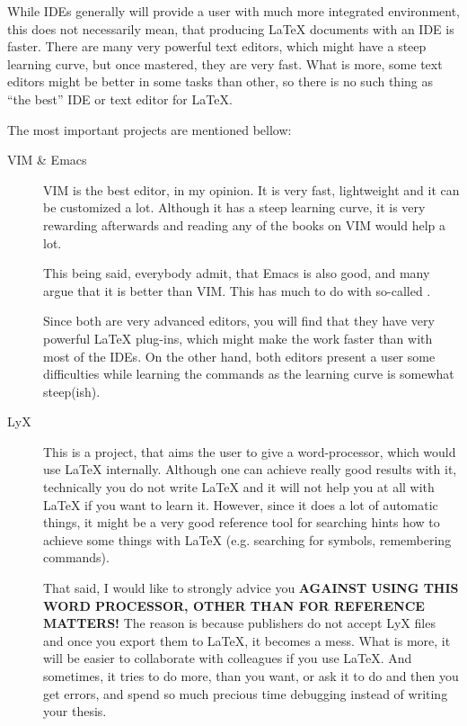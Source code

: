 \documentclass[
    draft
]{scrartcl}
\newcommand{\stress}[1]{\textbf{\uppercase{#1}}}
\begin{document}
%
While IDEs generally will provide a user with much more integrated environment,
    this does not necessarily mean, that producing \LaTeX{} documents with an
    IDE is faster. 
%
There are many very powerful text editors, which might have a steep learning
    curve, but once mastered, they are very fast.
%
What is more, some text editors might be better in some tasks than other, so
    there is no such thing as ``the best'' IDE or text editor for \LaTeX.

%
The most important projects are mentioned bellow:
\begin{description}
    \item[VIM \& Emacs] 
        VIM is the best editor, in my opinion.
        It is very fast, lightweight and it can be customized a lot.
        Although it has a steep learning curve, it is very rewarding afterwards
            and reading any of the books on VIM would help a lot. 
        
        This being said, everybody admit, that Emacs is also good, and many
            argue that it is better than VIM.
        This has much to do with so-called
        .

        Since both are very advanced editors, you will find that they have very
            powerful \LaTeX{} plug-ins, which might make the work faster than
            with most of the IDEs.
        On the other hand, both editors present a user some difficulties while
            learning the commands as the learning curve is somewhat steep(ish).

    \item[LyX] 
        This is a project, that aims the user to give a word-processor, which
            would use \LaTeX{} internally.
        Although one can achieve really good results with it, technically you do
            not write \LaTeX{} and it will not help you at all with \LaTeX{} if
            you want to learn it.
        However, since it does a lot of automatic things, it might be a very
            good reference tool for searching hints how to achieve some things
            with \LaTeX{} (e.g. searching for symbols, remembering commands). 
        
        That said, I would like to strongly advice you \stress{against using
            this word processor, other than for reference matters!}
        The reason is because publishers do not accept LyX files and once you
            export them to \LaTeX{}, it becomes a mess.
        What is more, it will be easier to collaborate with colleagues if you
            use \LaTeX{}.
        And sometimes, it tries to do more, than you want, or ask it to do and
            then you get errors, and spend so much precious time debugging
            instead of writing your thesis.


\end{description}
\end{document}
